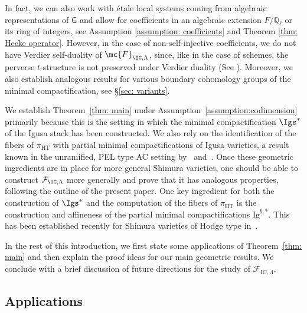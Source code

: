 \documentclass[letterpaper,11pt]{amsart}
\begin{document}
\begin{remark}{\label{rem: GeneralCoefficientSystems}}
In fact, we can also work with \'etale local systems coming from algebraic representations of $\mathsf{G}$ and allow for coefficients in an algebraic extension $F/\mathbb{Q}_{\ell}$ or its ring of integers, see Assumption \ref{assumption: coefficients} and Theorem \ref{thm: Hecke operator}. However, in the case of non-self-injective coefficients, we do not have Verdier self-duality of $\mc{F}_{\IC,\Lambda}$, since, like in the case of schemes, the perverse $t$-structure is not preserved under Verdier duality (See \cite[Section~2.1]{JuteauDecompositionNumbers}). Moreover, we also establish analogous results for various boundary cohomology groups of the minimal compactification, see \S \ref{sec: variants}.
\end{remark}

\begin{remark}\label{rem: generalizations to other Shimura varieties} We establish Theorem~\ref{thm: main} under Assumption~\ref{assumption:codimension} primarily because this is the setting in which the minimal compactification $\Igs^*$ of the Igusa stack has been constructed. We also rely on the identification of the fibers of $\pi_{\mathrm{HT}}$ with partial minimal compactifications of Igusa varieties, a result known in the unramified, PEL type AC setting by~\cite{CS2} and~\cite{santos}. Once these geometric ingredients are in place for more general Shimura varieties, one should be able to construct $\mathcal{F}_{\IC,\Lambda}$ more generally and prove that it has analogous properties, following the outline of the present paper. One key ingredient for both the construction of $\Igs^*$ and the computation of the fibers of $\pi_{\mathrm{HT}}$ is the construction and affineness of the partial minimal compactifications $\mathrm{Ig}^{b,*}$. This has been established recently for Shimura varieties of Hodge type in~\cite{shengkai-mao}. 
\end{remark}

In the rest of this introduction, we first state some applications of Theorem~\ref{thm: main} and then explain the proof ideas for our main geometric results. We conclude with a brief discussion of future directions for the study of $\mathcal{F}_{\mathrm{IC},\Lambda}$.  

\subsection{Applications}
\end{document}
